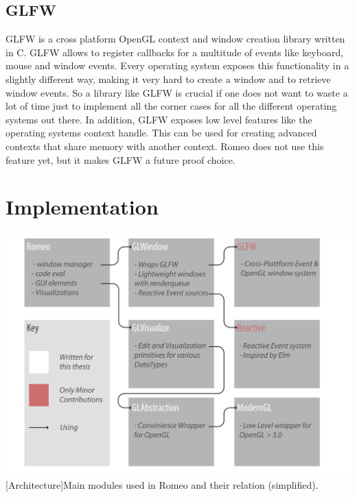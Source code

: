 \subsection{GLFW}
GLFW\cite{GLFW} is a cross platform \ac{OpenGL} context and window creation library written in C.
GLFW allows to register callbacks for a multitude of events like keyboard, mouse and window events.
Every operating system exposes this functionality in a slightly different way, making it very hard to create a window and to retrieve window events.
So a library like GLFW is crucial if one does not want to waste a lot of time just to implement all the corner cases for all the different operating systems out there.
In addition, GLFW exposes low level features like the operating systems context handle.
This can be used for creating advanced contexts that share memory with another context.
Romeo does not use this feature yet, but it makes GLFW a future proof choice.


\section{Implementation}

\vspace{1em}
\begin{minipage}{\linewidth}
    \centering
    \includegraphics[width=0.9\linewidth]{graphics/architecture.pdf}
    [Architecture]{Main modules used in Romeo and their relation (simplified).}
    \label{fig:architecture} 
\end{minipage}


